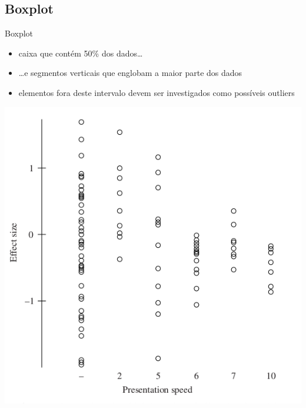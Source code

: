 \documentclass{beamer}
\begin{document}
\subsection{Boxplot}

\begin{frame}{Boxplot}
  \begin{itemize}
  \item caixa que contém 50\% dos dados\ldots
  \item \ldots e segmentos verticais que englobam a maior parte dos
    dados
  \item elementos fora deste intervalo devem ser investigados como
    possíveis outliers
  \end{itemize}
\end{frame}

\begin{frame}
  \begin{center}
    \includegraphics[height=0.7\textheight]{eda-boxplot1}
  \end{center}
\end{frame}
\end{document}
